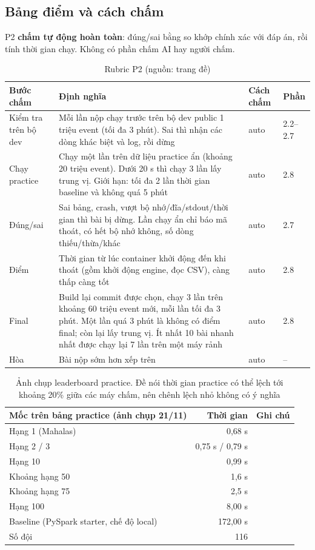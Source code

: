 \documentclass[a4paper,12pt]{article}
\newcommand{\src}[1]{{\footnotesize\textcolor{p7}{(nguồn: #1)}}}
\begin{document}
\subsection{Bảng điểm và cách chấm}
P2 \textbf{chấm tự động hoàn toàn}: đúng/sai bằng so khớp chính xác với đáp án, rồi tính thời gian chạy. Không có phần chấm AI hay người chấm.

\begin{table}[H]
\centering\small
\begin{tabularx}{\textwidth}{L{3.3cm}YC{1.6cm}C{1.6cm}}
\toprule
\textbf{Bước chấm} & \textbf{Định nghĩa} & \textbf{Cách chấm} & \textbf{Phần} \\
\midrule
Kiểm tra trên bộ dev & Mỗi lần nộp chạy trước trên bộ dev public 1 triệu event (tối đa 3 phút). Sai thì nhận các dòng khác biệt và log, rồi dừng & auto & 2.2--2.7 \\
Chạy practice & Chạy một lần trên dữ liệu practice ẩn (khoảng 20 triệu event). Dưới 20 s thì chạy 3 lần lấy trung vị. Giới hạn: tối đa 2 lần thời gian baseline và không quá 5 phút & auto & 2.8 \\
Đúng/sai & Sai bảng, crash, vượt bộ nhớ/đĩa/stdout/thời gian thì bài bị dừng. Lần chạy ẩn chỉ báo mã thoát, có hết bộ nhớ không, số dòng thiếu/thừa/khác & auto & 2.7 \\
Điểm & Thời gian từ lúc container khởi động đến khi thoát (gồm khởi động engine, đọc CSV), càng thấp càng tốt & auto & 2.8 \\
Final & Build lại commit được chọn, chạy 3 lần trên khoảng 60 triệu event mới, mỗi lần tối đa 3 phút. Một lần quá 3 phút là không có điểm final; còn lại lấy trung vị. Ít nhất 10 bài nhanh nhất được chạy lại 7 lần trên một máy rảnh & auto & 2.8 \\
Hòa & Bài nộp sớm hơn xếp trên & auto & -- \\
\bottomrule
\end{tabularx}
\caption{Rubric P2 \src{trang đề}}
\end{table}

\begin{table}[H]
\centering\small
\begin{tabular}{lrl}
\toprule
\textbf{Mốc trên bảng practice (ảnh chụp 21/11)} & \textbf{Thời gian} & \textbf{Ghi chú} \\
\midrule
Hạng 1 (Mahalas) & 0,68 s & \\
Hạng 2 / 3 & 0,75 s / 0,79 s & \\
Hạng 10 & 0,99 s & \\
Khoảng hạng 50 & 1,6 s & \\
Khoảng hạng 75 & 2,5 s & \\
Hạng 100 & 8,00 s & \\
Baseline (PySpark starter, chế độ local) & 172,00 s & \\
Số đội & 116 & \\
\bottomrule
\end{tabular}
\caption{Ảnh chụp leaderboard practice. Đề nói thời gian practice có thể lệch tới khoảng 20\% giữa các máy chấm, nên chênh lệch nhỏ không có ý nghĩa}
\end{table}
\end{document}
